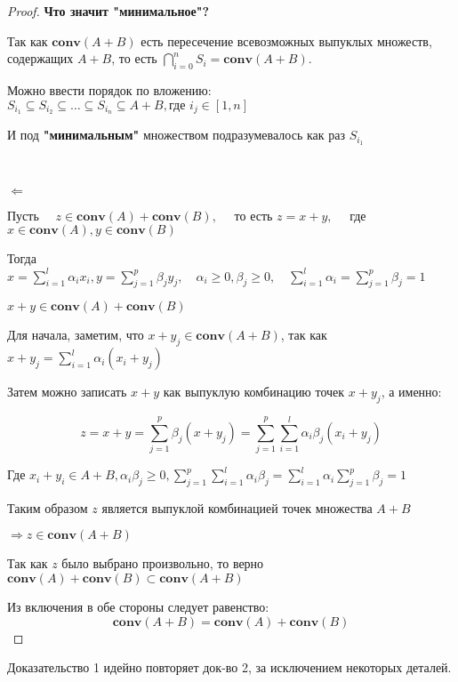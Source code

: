 \documentclass[a4paper,12pt]{article}
\begin{document}
\begin{proof}
\vspace{\baselineskip}
\textbf{Что значит "минимальное"?}

Так как $\mathbf{conv}\left( A + B\right)$ есть пересечение всевозможных выпуклых множеств, содержащих $A+B$, то есть $\bigcap\limits_{i=0}^n S_i = \mathbf{conv}\left( A + B\right)$.

Можно ввести порядок по вложению: $S_{i_1}\subseteq S_{i_2}\subseteq \dots\subseteq S_{i_n}\subseteq A+B, \text{где } i_j \in [1,n]$ 

И под \textbf{"минимальным"} множеством подразумевалось как раз $S_{i_1}$


~\

$\Longleftarrow $

Пусть $\quad z \in \mathbf{conv}\left( A\right) + \mathbf{conv}\left( B\right),\quad$ то есть $z = x +y,\quad$ где $x \in \mathbf{conv}\left(A\right), y \in \mathbf{conv}\left(B\right)$ 

Тогда $x = \sum\limits_{i=1}^{l} \alpha_ix_i , y = \sum\limits_{j=1}^{p} \beta_jy_j,\quad \alpha_i \geq 0, \beta_j \geq 0,\quad \sum\limits_{i=1}^{l} \alpha_i = \sum\limits_{j=1}^{p} \beta_j = 1$

$x + y \in \mathbf{conv}\left( A\right) + \mathbf{conv}\left( B\right) $

Для начала, заметим, что $x + y_j \in \mathbf{conv}(A+B)$, так как  $x + y_j = \sum\limits_{i=1}^{l} \alpha_i(x_i+y_j)$

Затем можно записать $x+y$ как выпуклую комбинацию точек $x+y_j$, а именно:

$$z = x + y =\sum\limits_{j=1}^{p} \beta_j(x+y_j) = \sum\limits_{j=1}^{p}\sum\limits_{i=1}^{l} \alpha_i\beta_j(x_i+y_j)$$

Где $x_i + y_i \in A+ B, \alpha_i\beta_j\geq 0,\sum\limits_{j=1}^{p}\sum\limits_{i=1}^{l} \alpha_i\beta_j =\sum\limits_{i=1}^{l}\alpha_i \sum\limits_{j=1}^{p}\beta_j =1$

Таким образом $z$ является выпуклой комбинацией точек множества $A+B$

$\Rightarrow z \in \mathbf{conv}\left( A + B\right)$

Так как $z$ было выбрано произвольно, то верно $  \mathbf{conv}\left( A\right) + \mathbf{conv}\left( B\right) \subset \mathbf{conv}\left( A + B\right)$

Из включения в обе стороны следует равенство:
$$  \mathbf{conv}\left( A + B\right) = \mathbf{conv}\left( A\right) + \mathbf{conv}\left( B\right) $$

\end{proof}
Доказательство 1 идейно повторяет док-во 2, за исключением некоторых деталей.
\end{document}
